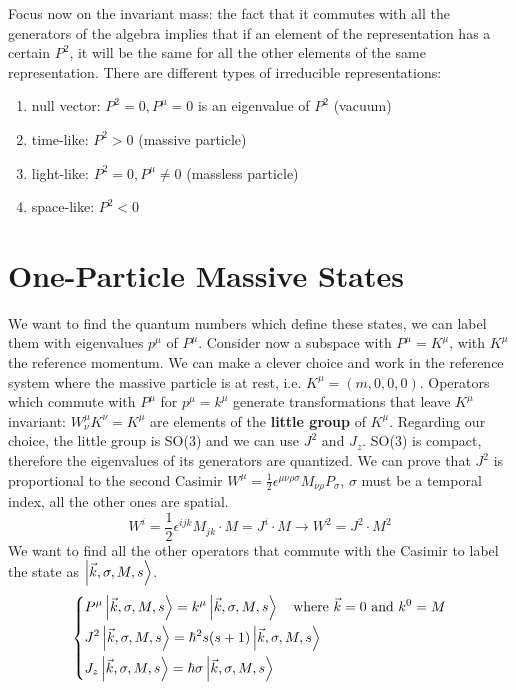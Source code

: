 \documentclass[../main.tex]{subfiles}
\begin{document}
Focus now on the invariant mass: the fact that it commutes with all the generators of the algebra implies that if an element of the representation has a certain $P^2$, it will be the same for all the other elements of the same representation. There are different types of irreducible representations:
\begin{enumerate}
    \item null vector: $P^2=0, P^\mu=0$ is an eigenvalue of $P^2$ (vacuum)
    \item time-like: $P^2>0$ (massive particle)
    \item light-like: $P^2=0, P^\mu\neq0$ (massless particle)
    \item space-like: $P^2<0$
\end{enumerate}
\section{One-Particle Massive States}
We want to find the quantum numbers which define these states, we can label them with eigenvalues $p^\mu$ of $P^\mu$. Consider now a subspace with $P^\mu=K^\mu$, with $K^\mu$ the reference momentum. We can make a clever choice and work in the reference system where the massive particle is at rest, i.e. $K^\mu=(m,0,0,0)$. Operators which commute with $P^\mu$ for $p^\mu=k^\mu$ generate transformations that leave $K^\mu$ invariant: $W^\mu_\nu K^\nu=K^\mu$ are elements of the \textbf{little group} of $K^\mu$. Regarding our choice, the little group is SO(3) and we can use $J^2$ and $J_z$. SO(3) is compact, therefore the eigenvalues of its generators are quantized. We can prove that $J^2$ is proportional to the second Casimir $W^\mu=\frac{1}{2}\epsilon^{\mu\nu\rho\sigma}M_{\nu\rho}P_\sigma$, $\sigma$ must be a temporal index, all the other ones are spatial.
\[
W^i=\frac{1}{2}\epsilon^{ijk}M_{jk}\cdot M=J^i\cdot M\xrightarrow[]{}W^2=J^2\cdot M^2
\]
We want to find all the other operators that commute with the Casimir to label the state as $\ket{\Vec{k},\sigma,M,s}$.
\[
\left\{
\begin{aligned}
&P^\mu\ket{\Vec{k},\sigma,M,s}=k^\mu\ket{\Vec{k},\sigma,M,s} \quad \text{where $\Vec{k}=0$ and $k^0=M$}\\
&J^2\ket{\Vec{k},\sigma,M,s}=\hbar^2s(s+1)\ket{\Vec{k},\sigma,M,s}\\
&J_z\ket{\Vec{k},\sigma,M,s}=\hbar\sigma\ket{\Vec{k},\sigma,M,s}
\end{aligned}
\right.
\]
\end{document}

